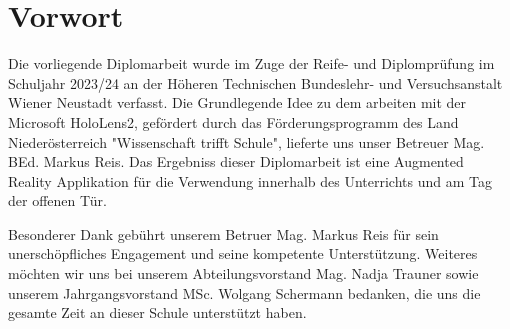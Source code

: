 \chapter{Vorwort}

Die vorliegende Diplomarbeit wurde im Zuge der Reife- und Diplomprüfung im Schuljahr 2023/24 an der Höheren Technischen
Bundeslehr- und Versuchsanstalt Wiener Neustadt verfasst. Die Grundlegende Idee zu dem arbeiten mit der Microsoft HoloLens2,
gefördert durch das Förderungsprogramm des Land Niederösterreich "Wissenschaft trifft Schule", lieferte uns unser Betreuer
Mag. BEd. Markus Reis. Das Ergebniss dieser Diplomarbeit ist eine Augmented Reality Applikation für die Verwendung innerhalb
des Unterrichts und am Tag der offenen Tür.

Besonderer Dank gebührt unserem Betruer Mag. Markus Reis  für sein unerschöpfliches Engagement und seine kompetente
Unterstützung. Weiteres möchten wir uns bei unserem Abteilungsvorstand Mag. Nadja Trauner sowie unserem Jahrgangsvorstand
MSc. Wolgang Schermann bedanken, die uns die gesamte Zeit an dieser Schule unterstützt haben.
